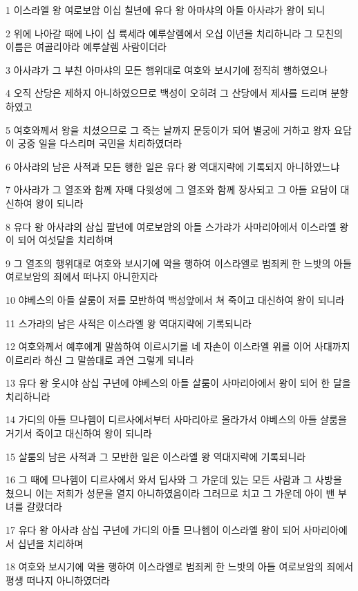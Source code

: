 \par 1 이스라엘 왕 여로보암 이십 칠년에 유다 왕 아마샤의 아들 아사랴가 왕이 되니
\par 2 위에 나아갈 때에 나이 십 륙세라 예루살렘에서 오십 이년을 치리하니라 그 모친의 이름은 여골리야라 예루살렘 사람이더라
\par 3 아사랴가 그 부친 아마샤의 모든 행위대로 여호와 보시기에 정직히 행하였으나
\par 4 오직 산당은 제하지 아니하였으므로 백성이 오히려 그 산당에서 제사를 드리며 분향하였고
\par 5 여호와께서 왕을 치셨으므로 그 죽는 날까지 문둥이가 되어 별궁에 거하고 왕자 요담이 궁중 일을 다스리며 국민을 치리하였더라
\par 6 아사랴의 남은 사적과 모든 행한 일은 유다 왕 역대지략에 기록되지 아니하였느냐
\par 7 아사랴가 그 열조와 함께 자매 다윗성에 그 열조와 함께 장사되고 그 아들 요담이 대신하여 왕이 되니라
\par 8 유다 왕 아사랴의 삼십 팔년에 여로보암의 아들 스가랴가 사마리아에서 이스라엘 왕이 되어 여섯달을 치리하며
\par 9 그 열조의 행위대로 여호와 보시기에 악을 행하여 이스라엘로 범죄케 한 느밧의 아들 여로보암의 죄에서 떠나지 아니한지라
\par 10 야베스의 아들 살룸이 저를 모반하여 백성앞에서 쳐 죽이고 대신하여 왕이 되니라
\par 11 스가랴의 남은 사적은 이스라엘 왕 역대지략에 기록되니라
\par 12 여호와께서 예후에게 말씀하여 이르시기를 네 자손이 이스라엘 위를 이어 사대까지 이르리라 하신 그 말씀대로 과연 그렇게 되니라
\par 13 유다 왕 웃시야 삼십 구년에 야베스의 아들 살룸이 사마리아에서 왕이 되어 한 달을 치리하니라
\par 14 가디의 아들 므나헴이 디르사에서부터 사마리아로 올라가서 야베스의 아들 살룸을 거기서 죽이고 대신하여 왕이 되니라
\par 15 살룸의 남은 사적과 그 모반한 일은 이스라엘 왕 역대지략에 기록되니라
\par 16 그 때에 므나헴이 디르사에서 와서 딥사와 그 가운데 있는 모든 사람과 그 사방을 쳤으니 이는 저희가 성문을 열지 아니하였음이라 그러므로 치고 그 가운데 아이 밴 부녀를 갈랐더라
\par 17 유다 왕 아사랴 삼십 구년에 가디의 아들 므나헴이 이스라엘 왕이 되어 사마리아에서 십년을 치리하며
\par 18 여호와 보시기에 악을 행하여 이스라엘로 범죄케 한 느밧의 아들 여로보암의 죄에서 평생 떠나지 아니하였더라
